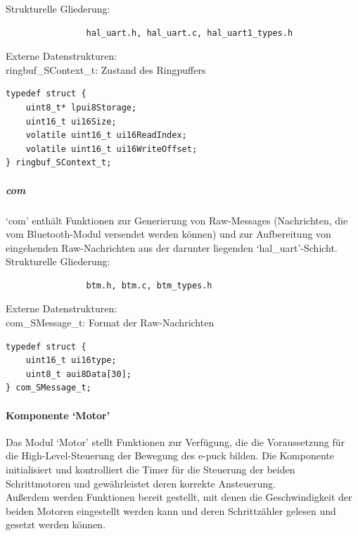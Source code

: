 \documentclass[10pt,a4paper]{article}
\begin{document}
				Strukturelle Gliederung:
				\begin{verbatim}  
				hal_uart.h, hal_uart.c, hal_uart1_types.h
				\end{verbatim}
				
				Externe Datenstrukturen: \\
				ringbuf\_SContext\_t: Zustand des Ringpuffers
				
				\lstset{language = C, tabsize = 4}
				\begin{lstlisting}[captionpos=b, caption={ringbuf\_SContext\_t}, frame = single]
typedef struct {
	uint8_t* lpui8Storage;
	uint16_t ui16Size;
	volatile uint16_t ui16ReadIndex;
	volatile uint16_t ui16WriteOffset;
} ringbuf_SContext_t;
				\end{lstlisting}
				
				\subparagraph*{com}
				`com' enthält Funktionen zur Generierung von Raw-Messages (Nachrichten, die vom Bluetooth-Modul versendet werden
				können) und zur Aufbereitung von eingehenden Raw-Nachrichten aus der darunter liegenden `hal\_uart'-Schicht. \\
				
				Strukturelle Gliederung:
				\begin{verbatim}  
				btm.h, btm.c, btm_types.h
				\end{verbatim}
				
				Externe Datenstrukturen: \\
				com\_SMessage\_t: Format der Raw-Nachrichten
				
				\lstset{language = C, tabsize = 4}
				\begin{lstlisting}[captionpos=b, caption={com\_SMessage\_t}, frame = single]
typedef struct {
	uint16_t ui16type;
	uint8_t aui8Data[30];
} com_SMessage_t;
				\end{lstlisting}
				
			\paragraph*{Komponente `Motor'}
			Das Modul `Motor' stellt Funktionen zur Verfügung, die die Voraussetzung für die High-Level-Steuerung der Bewegung des e-puck bilden.
			Die Komponente initialisiert und kontrolliert die Timer für die Steuerung der beiden Schrittmotoren und gewährleistet deren korrekte
			Ansteuerung. \\
			Außerdem werden Funktionen bereit gestellt, mit denen die Geschwindigkeit der beiden Motoren eingestellt werden kann und deren
			Schrittzähler gelesen und gesetzt werden können. \\
			
\end{document}
